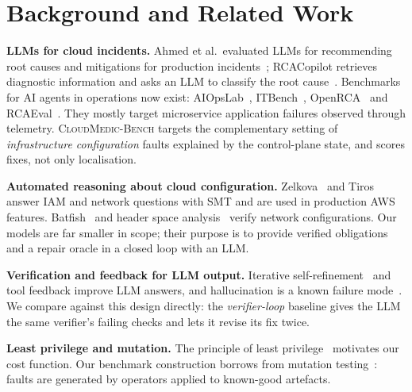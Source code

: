 \documentclass[conference]{IEEEtran}
\newcommand{\bench}{\textsc{CloudMedic-Bench}}
\begin{document}
\section{Background and Related Work}
\textbf{LLMs for cloud incidents.} Ahmed et al.\ evaluated LLMs for recommending root causes and mitigations for production
incidents~\cite{ahmed2023recommending}; RCACopilot retrieves diagnostic information and asks an LLM to classify the root
cause~\cite{chen2024rcacopilot}. Benchmarks for AI agents in operations now exist: AIOpsLab~\cite{chen2025aiopslab},
ITBench~\cite{jha2025itbench}, OpenRCA~\cite{xu2025openrca} and RCAEval~\cite{pham2025rcaeval}. They mostly target
microservice application failures observed through telemetry. \bench{} targets the complementary setting of
\emph{infrastructure configuration} faults explained by the control-plane state, and scores fixes, not only localisation.

\textbf{Automated reasoning about cloud configuration.} Zelkova~\cite{backes2018semantic} and Tiros~\cite{backes2019reachability}
answer IAM and network questions with SMT and are used in production AWS features. Batfish~\cite{fogel2015batfish} and header
space analysis~\cite{kazemian2012hsa} verify network configurations. Our models are far smaller in scope; their purpose is to
provide verified obligations and a repair oracle in a closed loop with an LLM.

\textbf{Verification and feedback for LLM output.} Iterative self-refinement~\cite{madaan2023selfrefine} and tool feedback improve
LLM answers, and hallucination is a known failure mode~\cite{ji2023hallucination}. We compare against this design directly: the
\emph{verifier-loop} baseline gives the LLM the same verifier's failing checks and lets it revise its fix twice.

\textbf{Least privilege and mutation.} The principle of least privilege~\cite{saltzer1975protection} motivates our cost function.
Our benchmark construction borrows from mutation testing~\cite{jia2011mutation}: faults are generated by operators applied to
known-good artefacts.
\end{document}
